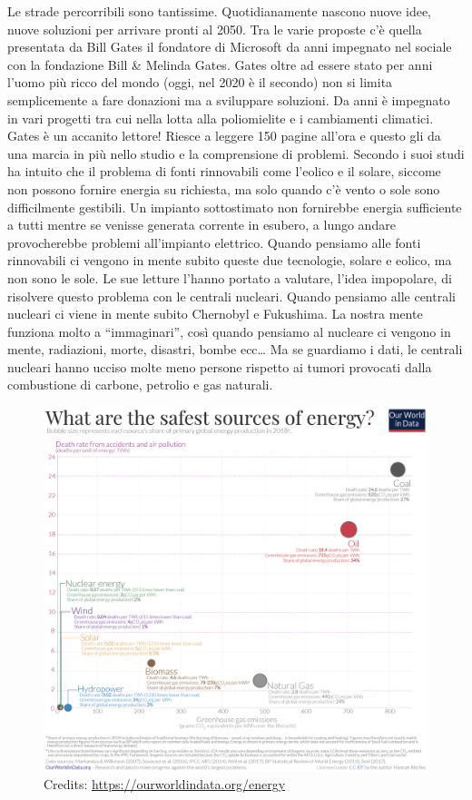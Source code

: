 \documentclass[12pt]{book} %
\begin{document}
Le strade percorribili sono tantissime. Quotidianamente nascono nuove idee, nuove soluzioni per arrivare pronti al 2050.
Tra le varie proposte c'è quella presentata da Bill Gates il fondatore di Microsoft da anni
impegnato nel sociale con la fondazione Bill \& Melinda Gates. Gates oltre ad essere stato per anni
l'uomo più ricco del mondo (oggi, nel 2020 è il secondo) non si limita semplicemente a fare
donazioni ma a sviluppare soluzioni. Da anni è impegnato in vari progetti tra cui nella lotta alla poliomielite e i
cambiamenti climatici. Gates è un accanito lettore! Riesce a leggere 150 pagine all'ora e questo
gli da una marcia in più nello studio e la comprensione di problemi. Secondo i suoi studi ha intuito che il problema di
fonti rinnovabili come l'eolico e il solare, siccome non possono fornire energia su richiesta, ma
solo quando c'è vento o sole sono difficilmente gestibili. Un impianto sottostimato non fornirebbe
energia sufficiente a tutti mentre se venisse generata corrente in esubero, a lungo andare provocherebbe problemi
all'impianto elettrico. Quando pensiamo alle fonti rinnovabili ci vengono in mente subito queste
due tecnologie, solare e eolico, ma non sono le sole. Le sue letture l'hanno portato a valutare,
l'idea impopolare, di risolvere questo problema con le centrali nucleari. Quando pensiamo alle
centrali nucleari ci viene in mente subito Chernobyl e Fukushima. La nostra mente funziona molto a “immaginari”, così
quando pensiamo al nucleare ci vengono in mente, radiazioni, morte, disastri, bombe ecc… Ma se guardiamo i dati, le
centrali nucleari hanno ucciso molte meno persone rispetto ai tumori provocati dalla combustione di carbone, petrolio e
gas naturali.

\begin{figure}[H]
  \begin{minipage}{17cm}
    \includegraphics[width=17cm]{images/Libro-img030.png}
    \caption{Credits: \protect\url{https://ourworldindata.org/energy} }
  \end{minipage}
\end{figure}
\end{document}
